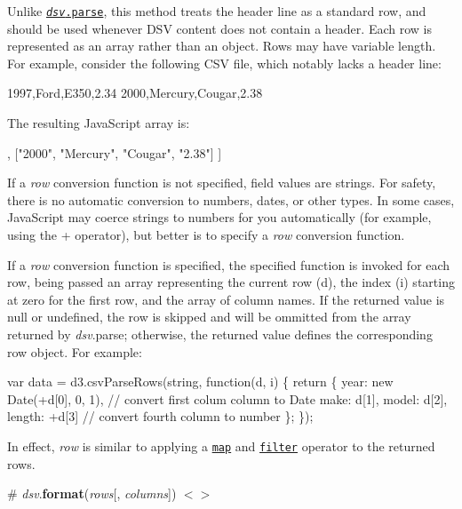 Unlike \href{#dsv_parse}{\tt {\itshape dsv}.parse}, this method treats the header line as a standard row, and should be used whenever D\+SV content does not contain a header. Each row is represented as an array rather than an object. Rows may have variable length. For example, consider the following C\+SV file, which notably lacks a header line\+:


\begin{DoxyCode}
1997,Ford,E350,2.34
2000,Mercury,Cougar,2.38
\end{DoxyCode}


The resulting Java\+Script array is\+:


\begin{DoxyCode}
[
  ["1997", "Ford", "E350", "2.34"],
  ["2000", "Mercury", "Cougar", "2.38"]
]
\end{DoxyCode}


If a {\itshape row} conversion function is not specified, field values are strings. For safety, there is no automatic conversion to numbers, dates, or other types. In some cases, Java\+Script may coerce strings to numbers for you automatically (for example, using the {\ttfamily +} operator), but better is to specify a {\itshape row} conversion function.

If a {\itshape row} conversion function is specified, the specified function is invoked for each row, being passed an array representing the current row ({\ttfamily d}), the index ({\ttfamily i}) starting at zero for the first row, and the array of column names. If the returned value is null or undefined, the row is skipped and will be ommitted from the array returned by {\itshape dsv}.parse; otherwise, the returned value defines the corresponding row object. For example\+:


\begin{DoxyCode}
var data = d3.csvParseRows(string, function(d, i) \{
  return \{
    year: new Date(+d[0], 0, 1), // convert first colum column to Date
    make: d[1],
    model: d[2],
    length: +d[3] // convert fourth column to number
  \};
\});
\end{DoxyCode}


In effect, {\itshape row} is similar to applying a \href{https://developer.mozilla.org/en/JavaScript/Reference/Global_Objects/Array/map}{\tt map} and \href{https://developer.mozilla.org/en/JavaScript/Reference/Global_Objects/Array/filter}{\tt filter} operator to the returned rows.

\label{_dsv_format}%
\# {\itshape dsv}.{\bfseries format}({\itshape rows}\mbox{[}, {\itshape columns}\mbox{]}) \href{https://github.com/d3/d3-dsv/blob/master/src/dsv.js#L105}{\tt $<$$>$}

